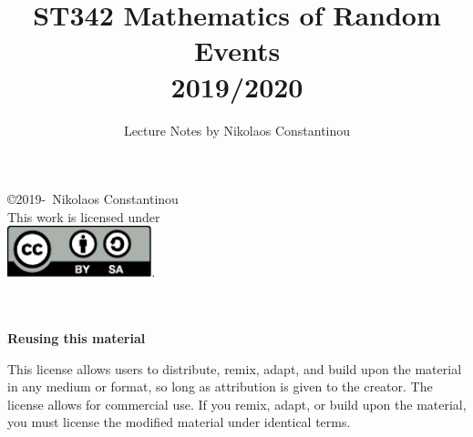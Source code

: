 \documentclass{article}
\title{ST342 Mathematics of Random Events \\ 2019/2020}
\author{Lecture Notes by Nikolaos Constantinou}
\begin{document}
\maketitle
\clearpage

\vspace*{\fill}

\hfil
\noindent
\copyright 2019-\the\year\ Nikolaos Constantinou
\\

\hfil
\noindent
This work is licensed under
\\

\hfil
\noindent
\href{http://creativecommons.org/licenses/by-sa/3.0/}
{\includegraphics[height=4.0em]{by-sa.pdf}}.
\\
\\
\\

\hfil
\parbox{.5\textwidth}{

\textbf{Reusing this material}

\noindent
This license allows users to distribute, remix, adapt, and build upon the material in any medium or format, so long as attribution is given to the creator. The license allows for commercial use. If you remix, adapt, or build upon the material, you must license the modified material under identical terms.}

\vfill

\clearpage
\tableofcontents
\newpage
\end{document}
